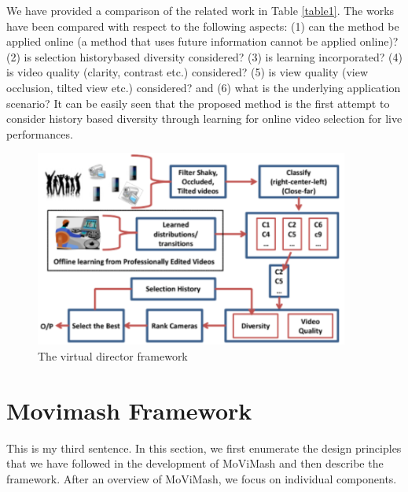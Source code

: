 \documentclass{sig-alternate}
\begin{document}
We have provided a comparison of the related work in Table \ref{table1}.
The works have been compared with respect to the following aspects:
(1) can the method be applied online (a method that uses future
information cannot be applied online)? (2) is selection historybased
diversity considered? (3) is learning incorporated? (4) is
video quality (clarity, contrast etc.) considered? (5) is view quality
(view occlusion, tilted view etc.) considered? and (6) what is the
underlying application scenario? It can be easily seen that the proposed
method is the first attempt to consider history based diversity
through learning for online video selection for live performances.

\begin{figure}
    \centering
    \includegraphics{img2.png}
    \caption{The virtual director framework}
    \label{fig:fig2}
\end{figure}

\section{Movimash Framework}\label{framework}
This is my third sentence.
In this section, we first enumerate the design principles that we have followed in the development of MoViMash and then describe the framework. After an overview of MoViMash, we focus on individual components.
\end{document}
